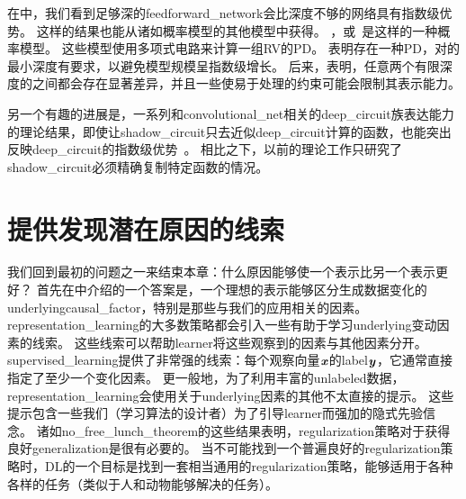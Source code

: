 
在中，我们看到足够深的\gls{feedforward_network}会比深度不够的网络具有指数级优势。
这样的结果也能从诸如概率模型的其他模型中获得。
，或~\citep{Poon+Domingos-2011}是这样的一种概率模型。
这些模型使用多项式电路来计算一组\gls{RV}的\gls{PD}。
\cite{Delalleau+Bengio-2011-small}表明存在一种\gls{PD}，对的最小深度有要求，以避免模型规模呈指数级增长。
后来，\cite{Martens+Medabalimi-arxiv2014}表明，任意两个有限深度的之间都会存在显著差异，并且一些使易于处理的约束可能会限制其表示能力。


另一个有趣的进展是，一系列和\gls{convolutional_net}相关的\gls{deep_circuit}族表达能力的理论结果，即使让\gls{shadow_circuit}只去近似\gls{deep_circuit}计算的函数，也能突出反映\gls{deep_circuit}的指数级优势~\citep{Cohen-et-al-arXiv2015}。
相比之下，以前的理论工作只研究了\gls{shadow_circuit}必须精确复制特定函数的情况。


\section{提供发现潜在原因的线索}
\label{sec:providing_clues_to_discover_underlying_causes}


我们回到最初的问题之一来结束本章：什么原因能够使一个表示比另一个表示更好？
首先在中介绍的一个答案是，一个理想的表示能够区分生成数据变化的\gls{underlying}\gls{causal_factor}，特别是那些与我们的应用相关的因素。
\gls{representation_learning}的大多数策略都会引入一些有助于学习\gls{underlying}变动因素的线索。
这些线索可以帮助\gls{learner}将这些观察到的因素与其他因素分开。
\gls{supervised_learning}提供了非常强的线索：每个观察向量$\boldsymbol{\mathit{x}}$的\gls{label}$\boldsymbol{\mathit{y}}$，它通常直接指定了至少一个变化因素。
更一般地，为了利用丰富的\gls{unlabeled}数据，\gls{representation_learning}会使用关于\gls{underlying}因素的其他不太直接的提示。
这些提示包含一些我们（学习算法的设计者）为了引导\gls{learner}而强加的隐式先验信念。
诸如\gls{no_free_lunch_theorem}的这些结果表明，\gls{regularization}策略对于获得良好\gls{generalization}是很有必要的。
当不可能找到一个普遍良好的\gls{regularization}策略时，\gls{DL}的一个目标是找到一套相当通用的\gls{regularization}策略，能够适用于各种各样的任务（类似于人和动物能够解决的任务）。

